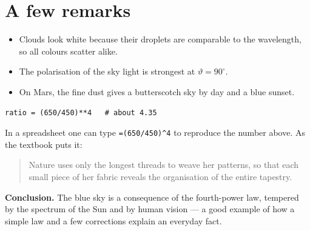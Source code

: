 \documentclass[10pt,letterpaper]{article}
\begin{document}
\section{A few remarks}
\begin{itemize}
  \item Clouds look white because their droplets are comparable to the wavelength, so all colours scatter alike.
  \item The polarisation of the sky light is strongest at $\vartheta=90^\circ$.
  \item On Mars, the fine dust gives a butterscotch sky by day and a blue sunset.
\end{itemize}

\begin{verbatim}
ratio = (650/450)**4   # about 4.35
\end{verbatim}

In a spreadsheet one can type \verb|=(650/450)^4| to reproduce the number above. As the textbook puts it:
\begin{quotation}
Nature uses only the longest threads to weave her patterns, so that each small piece of her fabric reveals the organisation of the entire tapestry.
\end{quotation}

\vspace{1ex}
\noindent\textbf{Conclusion.} The blue sky is a consequence of the fourth-power law, tempered by the spectrum of the Sun and by human vision --- a good example of how a simple law and a few corrections explain an everyday fact.
\end{document}
